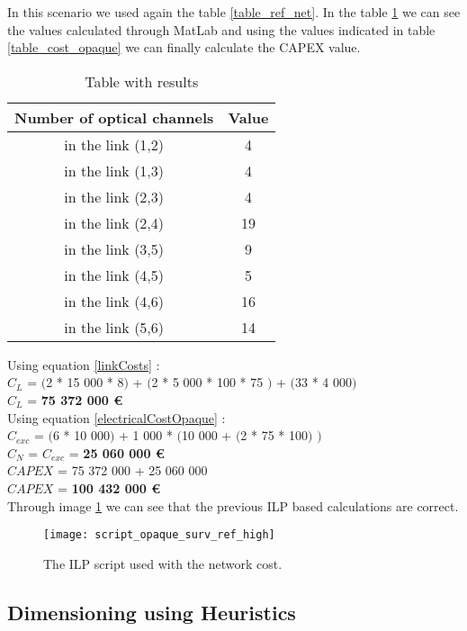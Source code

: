 In this scenario we used again the table \ref{table_ref_net}. In the table \ref{result_ILP2_reference} we can see the values calculated through MatLab and using the values indicated in table \ref{table_cost_opaque} we can finally calculate the CAPEX value.
\begin{table}[h!]
\centering
\begin{tabular}{|| c | c||}
 \hline
 Number of optical channels & Value \\
 \hline\hline
 in the link (1,2) & 4 \\
 in the link (1,3) & 4 \\
 in the link (2,3) & 4 \\
 in the link (2,4) & 19 \\
 in the link (3,5) & 9 \\
 in the link (4,5) & 5 \\
 in the link (4,6) & 16 \\
 in the link (5,6) & 14 \\
 \hline
\end{tabular}
\caption{Table with results}
\label{result_ILP2_reference}
\end{table}

Using equation \ref{linkCosts} : \\
$C_L$ = $($2 * 15 000 * 8$)$ + $($2 * 5 000 * 100 * 75 $)$ + $($33 * 4 000$)$ \\
$C_L$ = \textbf{ 75 372 000 \euro} \\

Using equation \ref{electricalCostOpaque} : \\
$C_{exc}$ = $($6 * 10 000$)$ + 1 000 * $($10 000 + $($2 * 75 * 100$)$ $)$ \\
$C_N$ = $C_{exc}$ = \textbf{25 060 000 \euro} \\

$CAPEX$ = 75 372 000 + 25 060 000 \\
$CAPEX$ = \textbf{100 432 000 \euro}\\

Through image \ref{scriptopaque_surv_ref_high} we can see that the previous ILP based calculations are correct.
\begin{figure}[h!]
\centering
\texttt{[image: script\_opaque\_surv\_ref\_high]}
\caption{The ILP script used with the network cost.}
\label{scriptopaque_surv_ref_high}
\end{figure}


\subsection{Dimensioning using Heuristics}


